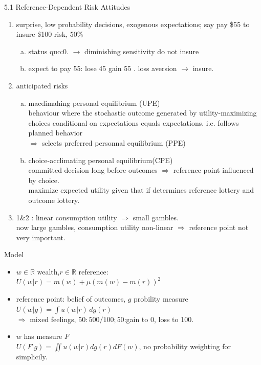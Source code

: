 \documentclass[11pt,aspectratio=169]{beamer}
\begin{document}
\begin{frame}{5.1 Reference-Dependent Risk Attitudes}
    \begin{enumerate}
        \item surprise, low probability decisions, exogenous expectations; say pay \$55 to insure \$100 risk, 50\%\medskip
        \begin{enumerate}[(a)]
            \item status quo:0. $\rightarrow$ diminishing sensitivity do not insure\medskip
            \item expect to pay 55: lose 45 gain 55 . loss aversion $\rightarrow$ insure.\medskip
        \end{enumerate}
        \item anticipated risks
        \begin{enumerate}[(a)]
            \item macdimahing personal equilibrium (UPE)\\
            behaviour where the stochastic outcome generated by utility-maximizing choices conditional on expectations equals expectations. i.e. follows planned behavior\\
            $\Rightarrow$ selects preferred personnal equilibrium (PPE)\medskip

            \item choice-acclimating personal equilibrium(CPE)\\
            committed decision long before outcomes $\Rightarrow$ reference point influenced by choice.\\
            maximize expected utility given that if determines reference lottery and outcome lottery.\medskip
        \end{enumerate}
        \item 1\&2 : linear consumption utility\medskip
        $\Rightarrow$ small gambles.\\
        now large gambles, consumption utility non-linear  $\Rightarrow$ reference point not very important.
    \end{enumerate}
\end{frame}


\begin{frame}{Model}
    \begin{itemize}
        \item $ w \in \mathbb{R}$ wealth,$r \in \mathbb{R} $ reference:\\
        $ U(w | r)=m(w)+\mu(m(w)-m(r))^2$\medskip
        \item reference point: belief of outcomes, $g $ probility measure\\
         $U(w | g)=\int u(w|r)  \,dg(r)$\\$  \Rightarrow$ mixed feelings, $50:50  0/100; 50$:gain to 0, loss to 100.\medskip
        \item $w $ has measure $F$\\
        $U(F|g)=\iint u(w|r) dg(r) dF(w) $, no probability weighting for simplicily.\medskip

	\end{itemize}
\end{frame}
\end{document}
